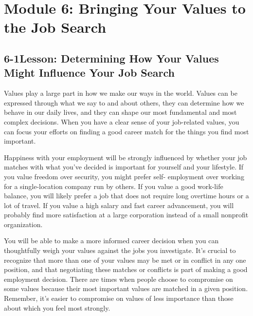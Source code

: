 \pagebreak \section*{Module 6:	Bringing Your Values to the Job Search}
\noindent\makebox[\textwidth]{\rule{\linewidth}{0.4pt}} 
\localtableofcontents
\noindent\makebox[\textwidth]{\rule{\linewidth}{0.4pt}}


\pagebreak \subsection*{6-1\quad Lesson: Determining How Your Values Might Influence Your Job Search}
Values play a large part in how we make our ways in the world. Values can be expressed through what we say to and about others, they can determine how we behave in our daily lives, and they can shape our most fundamental and most complex decisions. When you have a clear sense of your job-related values, you can focus your efforts on finding a good career match for the things you find most important.

Happiness with your employment will be strongly influenced by whether your job matches with what you've decided is important for yourself and your lifestyle. If you value freedom over security, you might prefer self- employment over working for a single-location company run by others. If you value a good work-life balance, you will likely prefer a job that does not require long overtime hours or a lot of travel. If you value a high salary and fast career advancement, you will probably find more satisfaction at a large corporation instead of a small nonprofit organization.

You will be able to make a more informed career decision when you can thoughtfully weigh your values against the jobs you investigate. It's crucial to recognize that more than one of your values may be met or in conflict in any one position, and that negotiating these matches or conflicts is part of making a good employment decision. There are times when people choose to compromise on some values because their most important values are matched in a given position. Remember, it's easier to compromise on values of less importance than those about which you feel most strongly.


